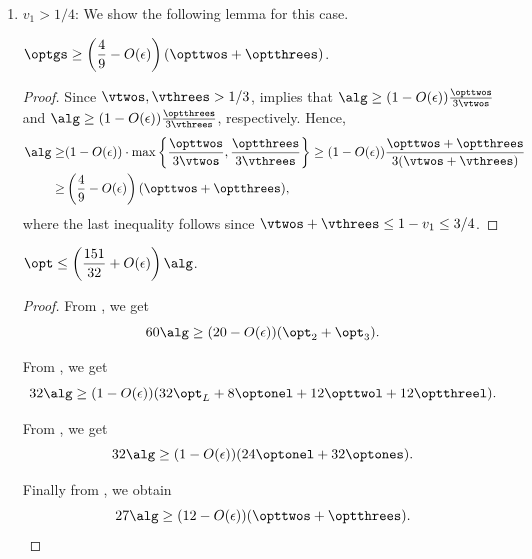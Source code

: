 \begin{enumerate}
    \item $v_1 > 1/4$: We show the following lemma for this case.

    \begin{lemma}
    \label{lem:optgslb}
        $\displaystyle\optgs \ge \left(\frac{4}{9}-O(\epsilon)\right)(\opttwos+\optthrees)$.
    \end{lemma}
    \begin{proof}
        Since $\vtwos, \vthrees > 1/3$,  implies that $\alg \ge (1-O(\epsilon))\frac{\opttwos}{3\vtwos}$ and $\alg \ge (1-O(\epsilon))\frac{\optthrees}{3\vthrees}$, respectively. Hence,
        \begin{align*}
        \alg \ge& (1-O(\epsilon))\cdot \max\left\{\frac{\opttwos}{3\vtwos},\frac{\optthrees}{3\vthrees}\right\} \ge (1-O(\epsilon))\frac{\opttwos+\optthrees}{3(\vtwos+\vthrees)} \\ \ge& \left(\frac{4}{9}-O(\epsilon)\right)(\opttwos+\optthrees),
        \end{align*}
        where the last inequality follows since $\vtwos+\vthrees \le 1-v_1\le 3/4$.
    \end{proof}


    \begin{claim}
    \label{cla:151by32}
        $\displaystyle\opt \le \left(\frac{151}{32}+O(\epsilon)\right)\alg$.
    \end{claim}
    \begin{proof}
        From , we get
        \begin{equation}
        \label{eqn:4a}
            60\alg \ge (20-O(\epsilon))(\opt_2 + \opt_3).
        \end{equation}

        From , we get
        \begin{equation}
        \label{eqn:4b}
            32\alg \ge (1-O(\epsilon))(32\opt_L + 8\optonel + 12\opttwol + 12\optthreel).
        \end{equation}

        From , we get
        \begin{equation}
        \label{eqn:4c}
            32\alg \ge (1-O(\epsilon))(24\optonel + 32\optones).
        \end{equation}

        Finally from , we obtain
        \begin{equation}
        \label{eqn:4d}
            27\alg \ge (12-O(\epsilon))(\opttwos + \optthrees).
        \end{equation}


\end{proof}
\end{enumerate}

